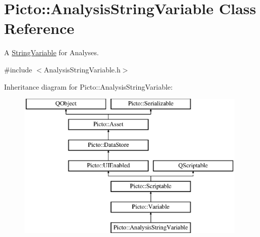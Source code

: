 \hypertarget{class_picto_1_1_analysis_string_variable}{\section{Picto\-:\-:Analysis\-String\-Variable Class Reference}
\label{class_picto_1_1_analysis_string_variable}
}


A \hyperlink{class_picto_1_1_string_variable}{String\-Variable} for Analyses.  




{\ttfamily \#include $<$Analysis\-String\-Variable.\-h$>$}

Inheritance diagram for Picto\-:\-:Analysis\-String\-Variable\-:\begin{figure}[H]
\begin{center}
\leavevmode
\includegraphics[height=7.000000cm]{class_picto_1_1_analysis_string_variable}
\end{center}
\end{figure}
